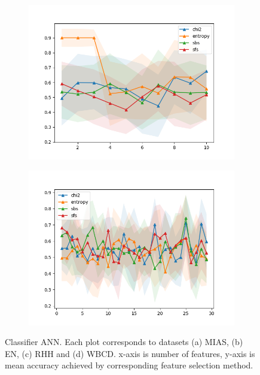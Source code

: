 \begin{figure}[htbp]
  \begin{subfigure}[b]{0.475\textwidth}
      \centering
      \includegraphics[width=\textwidth]{../plots_with_std_fill/ANNd3.png}
      \caption[]%
      {{\small}}
      \label{fig:ANN_RHH}
  \end{subfigure}
  \quad
  \begin{subfigure}[b]{0.475\textwidth}
      \centering
      \includegraphics[width=\textwidth]{../plots_with_std_fill/ANNd4.png}
      \caption[]%
      {{\small}}
      \label{fig:ANN_WBCD}
  \end{subfigure}
  \caption[]
  {\small
    Classifier ANN. Each plot corresponds to datasets (a) MIAS, (b) EN, (c) RHH and (d) WBCD. x-axis is number of features, y-axis is mean accuracy achieved by corresponding feature selection method.
  }
  \label{fig:plots_ANN}
\end{figure}
